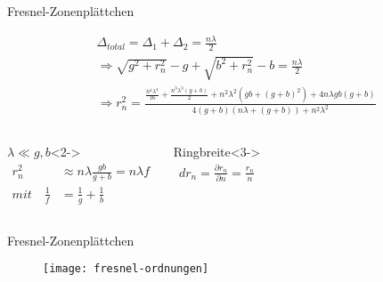 \begin{frame}{Fresnel-Zonenplättchen}{}
	\begin{block}{}
		\begin{align*}
			&\Delta_{total} = \Delta_1+\Delta_2 = \frac{n\lambda}{2}\\
			&\Rightarrow \sqrt{g^2+r_n^2}-g+ \sqrt{b^2+r_n^2}-b = \frac{n\lambda}{2} \\
			&\Rightarrow r_n^2 = \frac{\frac{n^4\lambda^4}{16}+\frac{n^3\lambda^3(g+b)}{2}+n^2\lambda^2(gb+(g+b)^2)+4n\lambda gb (g+b)}{4(g+b)(n\lambda
					+(g+b))+n^2\lambda^2}
		\end{align*}
	\end{block}

	\begin{columns}
			\begin{block}{$\lambda \ll g,b$}<2->
				\begin{align*}
					r_n^2 &\approx n\lambda \frac{gb}{g+b} = n\lambda f\\
					mit\quad \frac{1}{f} &= \frac{1}{g}+\frac{1}{b}					
				\end{align*}
			\end{block}
			\begin{block}{Ringbreite}<3->
				\begin{align*}
					dr_n = \frac{\partial r_n}{\partial n} = \frac{r_n}{n}
				\end{align*}
			\end{block}
	\end{columns}
\end{frame}

\begin{frame}{Fresnel-Zonenplättchen}{}
	\begin{figure}[H]
		\begin{center}
			\texttt{[image: fresnel-ordnungen]}
		\end{center}
	\end{figure}
\end{frame}

